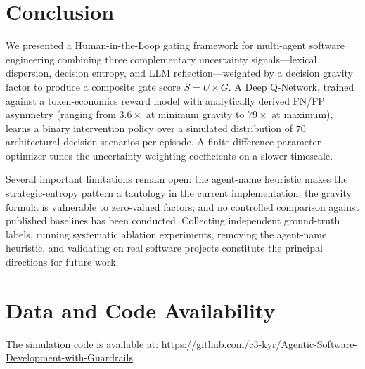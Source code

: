 \documentclass[conference]{IEEEtran}
\newif\ifanonymous
\begin{document}
\section{Conclusion}\label{sec:conclusion}

We presented a Human-in-the-Loop gating framework for multi-agent software
engineering combining three complementary uncertainty signals---lexical
dispersion, decision entropy, and LLM reflection---weighted by a decision
gravity factor to produce a composite gate score $S = U \times G$.
A Deep Q-Network, trained against a token-economics reward model with
analytically derived FN/FP asymmetry (ranging from $3.6\times$ at minimum
gravity to $79\times$ at maximum), learns a binary intervention policy over
a simulated distribution of 70 architectural decision scenarios per episode.
A finite-difference parameter optimizer tunes the uncertainty weighting
coefficients on a slower timescale.

Several important limitations remain open: the agent-name heuristic makes
the strategic-entropy pattern a tautology in the current implementation;
the gravity formula is vulnerable to zero-valued factors; and no controlled
comparison against published baselines has been conducted.
Collecting independent ground-truth labels, running systematic ablation
experiments, removing the agent-name heuristic, and validating on real
software projects constitute the principal directions for future work.

\section*{Data and Code Availability}
\ifanonymous
  Code and simulation data will be made available upon acceptance.
\else
  The simulation code is available at:
  \url{https://github.com/c3-kyr/Agentic-Software-Development-with-Guardrails}
\fi

\balance


\end{document}
